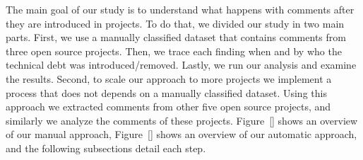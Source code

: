 
The main goal of our study is to understand what happens with \SATD comments after they are introduced in projects. To do that, we divided our study in two main parts. First, we use a manually classified dataset that contains \SATD comments from three open source projects. Then, we trace each \SATD finding when and by who the technical debt was introduced/removed. Lastly, we run our analysis and examine the results. Second, to scale our approach to more projects we implement a process that does not depends on a manually classified dataset. Using this approach we extracted \SATD comments from other five open source projects, and similarly we analyze the \SATD comments of these projects. Figure~\ref{} shows an overview of our manual approach, Figure~\ref{} shows an overview of our automatic approach, and the following subsections detail each step.








